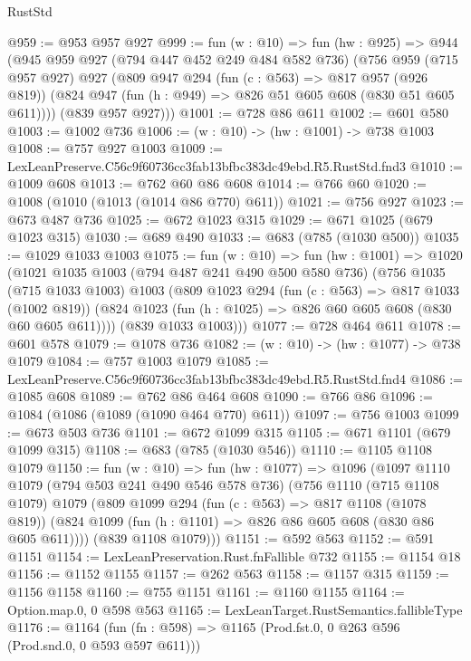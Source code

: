 \begin{lexlean}{RustStd}
\begin{coremodule}
@959 := @953 @957 @927
@999 := fun (w : @10) =>
  fun (hw : @925) =>
  @944
    (@945
      @959
      @927
      (@794 @447 @452 @249 @484 @582 @736)
      (@756
        @959
        (@715 @957 @927)
        @927
        (@809
          @947
          @294
          (fun (c : @563) => @817 @957 (@926 @819))
          (@824 @947 (fun (h : @949) => @826 @51 @605 @608 (@830 @51 @605 @611))))
        (@839 @957 @927)))
@1001 := @728 @86 @611
@1002 := @601 @580
@1003 := @1002 @736
@1006 := (w : @10) -> (hw : @1001) -> @738 @1003
@1008 := @757 @927 @1003
@1009 := LexLeanPreserve.C56c9f60736cc3fab13bfbc383dc49ebd.R5.RustStd.fnd3
@1010 := @1009 @608
@1013 := @762 @60 @86 @608
@1014 := @766 @60
@1020 := @1008 (@1010 (@1013 (@1014 @86 @770) @611))
@1021 := @756 @927
@1023 := @673 @487 @736
@1025 := @672 @1023 @315
@1029 := @671 @1025 (@679 @1023 @315)
@1030 := @689 @490
@1033 := @683 (@785 (@1030 @500))
@1035 := @1029 @1033 @1003
@1075 := fun (w : @10) =>
  fun (hw : @1001) =>
  @1020
    (@1021
      @1035
      @1003
      (@794 @487 @241 @490 @500 @580 @736)
      (@756
        @1035
        (@715 @1033 @1003)
        @1003
        (@809
          @1023
          @294
          (fun (c : @563) => @817 @1033 (@1002 @819))
          (@824 @1023 (fun (h : @1025) => @826 @60 @605 @608 (@830 @60 @605 @611))))
        (@839 @1033 @1003)))
@1077 := @728 @464 @611
@1078 := @601 @578
@1079 := @1078 @736
@1082 := (w : @10) -> (hw : @1077) -> @738 @1079
@1084 := @757 @1003 @1079
@1085 := LexLeanPreserve.C56c9f60736cc3fab13bfbc383dc49ebd.R5.RustStd.fnd4
@1086 := @1085 @608
@1089 := @762 @86 @464 @608
@1090 := @766 @86
@1096 := @1084 (@1086 (@1089 (@1090 @464 @770) @611))
@1097 := @756 @1003
@1099 := @673 @503 @736
@1101 := @672 @1099 @315
@1105 := @671 @1101 (@679 @1099 @315)
@1108 := @683 (@785 (@1030 @546))
@1110 := @1105 @1108 @1079
@1150 := fun (w : @10) =>
  fun (hw : @1077) =>
  @1096
    (@1097
      @1110
      @1079
      (@794 @503 @241 @490 @546 @578 @736)
      (@756
        @1110
        (@715 @1108 @1079)
        @1079
        (@809
          @1099
          @294
          (fun (c : @563) => @817 @1108 (@1078 @819))
          (@824 @1099 (fun (h : @1101) => @826 @86 @605 @608 (@830 @86 @605 @611))))
        (@839 @1108 @1079)))
@1151 := @592 @563
@1152 := @591 @1151
@1154 := LexLeanPreservation.Rust.fnFallible @732
@1155 := @1154 @18
@1156 := @1152 @1155
@1157 := @262 @563
@1158 := @1157 @315
@1159 := @1156 @1158
@1160 := @755 @1151
@1161 := @1160 @1155
@1164 := Option.map.{0, 0} @598 @563
@1165 := LexLeanTarget.RustSemantics.fallibleType
@1176 := @1164
    (fun (fn : @598) => @1165 (Prod.fst.{0, 0} @263 @596 (Prod.snd.{0, 0} @593 @597 @611)))

\end{coremodule}
\end{lexlean}
